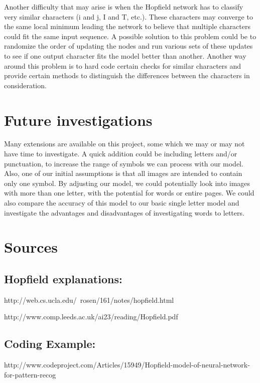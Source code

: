\documentclass[11pt,reqno]{article}
\begin{document}
\quad Another difficulty that may arise is when the Hopfield network has to classify very similar characters (i and j, I and T, etc.). These characters may converge to the same local minimum leading the network to believe that multiple characters could fit the same input sequence. A possible solution to this problem could be to randomize the order of updating the nodes and run various sets of these updates to see if one output character fits the model better than another. Another way around this problem is to hard code certain checks for similar characters and provide certain methods to distinguish the differences between the characters in consideration.
\section{Future investigations}
    Many extensions are available on this project, some which we may or may not have time to investigate.  A quick addition could be including letters and/or punctuation, to increase the range of symbols we can process with our model.  Also, one of our initial assumptions is that all images are intended to contain only one symbol.  By adjusting our model, we could potentially look into images with more than one letter, with the potential for words or entire pages.  We could also compare the accuracy of this model to our basic single letter model and investigate the advantages and disadvantages of investigating words to letters.

\newpage

\section{Sources}
\subsection{Hopfield explanations:}
http://web.cs.ucla.edu/~rosen/161/notes/hopfield.html

http://www.comp.leeds.ac.uk/ai23/reading/Hopfield.pdf
\subsection{Coding Example:   } 
http://www.codeproject.com/Articles/15949/Hopfield-model-of-neural-network-for-pattern-recog
\end{document}
